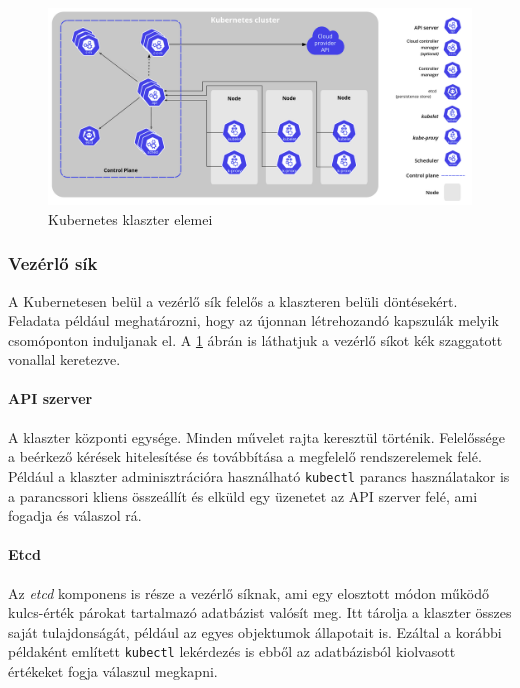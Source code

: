 \begin{figure}[!ht]
\centering
\includegraphics[width=150mm, keepaspectratio]{figures/kubernetes_components.png}
\caption{Kubernetes klaszter elemei\citep{KubernetesComponents}}
\label{fig:k8s_components}
\end{figure}

\subsubsection{Vezérlő sík}
\label{subsec:controlplane}
A Kubernetesen belül a vezérlő sík felelős a klaszteren belüli döntésekért. 
Feladata például meghatározni, hogy az újonnan létrehozandó kapszulák melyik csomóponton induljanak el.
A \ref{fig:k8s_components} ábrán is láthatjuk a vezérlő síkot kék szaggatott vonallal keretezve.

\paragraph{API szerver} A klaszter központi egysége. 
Minden művelet rajta keresztül történik. Felelőssége a beérkező kérések hitelesítése és továbbítása a megfelelő rendszerelemek felé. 
Például a klaszter adminisztrációra használható \verb+kubectl+ parancs használatakor is a parancssori kliens összeállít és elküld egy üzenetet az API szerver felé, ami fogadja és válaszol rá.

\paragraph{Etcd} Az \textit{etcd} komponens is része a vezérlő síknak, ami egy elosztott módon működő\citep{raft} kulcs-érték párokat tartalmazó adatbázist valósít meg.
Itt tárolja a klaszter összes saját tulajdonságát, például az egyes objektumok állapotait is.
Ezáltal a korábbi példaként említett \verb+kubectl+ lekérdezés is ebből az adatbázisból kiolvasott értékeket fogja válaszul megkapni.

